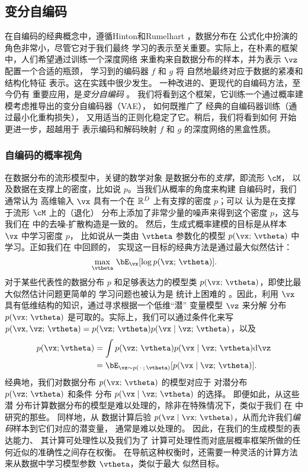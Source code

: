 \documentclass[../../book-main.tex]{subfiles}
\begin{document}
\subsection{变分自编码}\label{sec:vae}

在自编码的经典概念中，遵循Hinton和Rumelhart
\cite{Rumelhart1986}，数据分布在
公式化中扮演的角色非常小，尽管它对于我们最终
学习的表示至关重要。实际上，在朴素的框架中，人们希望通过训练一个深度网络
来重构来自数据分布的样本，并为表示 $\vz$ 配置一个合适的瓶颈，
学习到的编码器 $f$ 和 $g$ 将
自然地最终对应于数据的紧凑和结构化特征
表示。这在实践中很少发生。
一种改进的、更现代的自编码方法，至今仍有
重要应用，是\textit{变分自编码}
\cite{Kingma2013-sb,Kingma2019-zh}。
我们将看到这个框架，它训练一个通过概率建模考虑推导出的变分自编码器（VAE），
如何既推广了
经典的自编码器训练（通过最小化重构损失），
又用适当的正则化稳定了它。稍后，我们将看到如何
开始更进一步，超越用于
表示编码和解码映射 $f$ 和 $g$ 的深度网络的黑盒性质。

\subsubsection{自编码的概率视角}
在数据分布的流形模型中，关键的数学对象
是数据分布的\textit{支撑}，即流形 $\cM$，
以及数据在支撑上的密度，比如说 $p$。当我们从概率的角度来构建
自编码时，我们通常认为
高维输入 $\vx$ 具有一个在 $\mathbb{R}^D$ 上有支撑的密度 $p$；可以
认为是在支撑于流形 $\cM$ 上的（退化）
分布上添加了非常少量的噪声来得到这个密度 $p$，这与我们在  中的去噪-扩散构造是一致的。
然后，生成式概率建模的目标是从样本 $\vx$ 中学习密度 $p$，
比如说从一类由 $\vtheta$ 参数化的模型 $p(\vx;\, \vtheta)$ 中学习。正如我们在  中回顾的，
实现这一目标的经典方法是通过最大似然估计：
\begin{equation*}\label{eq:VAE-MLE}
\max_{\vtheta}\, \bE_{\vx}[ \log p(\vx;\, \vtheta) ].
\end{equation*}
对于某些代表性的数据分布 $p$ %
和足够表达力的模型类 $p(\vx;\, \vtheta)$，即使比最大似然估计问题更简单的
学习问题也被认为是
统计上困难的 \cite{Yang1999-wb}。因此，利用
$\vx$ 具有低维结构的知识，通过寻求根据一个低维“潜”
变量模型 $\vz$ 来分解
分布 $p(\vx ;\, \vtheta)$ 是可取的。实际上，我们可以通过条件化来写 $p(\vx,
\vz ;\, \vtheta)
= p(\vz;\, \vtheta) p(\vx \mid \vz;\, \vtheta)$，以及
\begin{align*}
p(\vx; \vtheta) &= \int p(\vz;\, \vtheta) p(\vx \mid \vz;\, \vtheta) \odif \vz
\\
&=
\bE_{\vz \sim p(\,\cdot\,;\, \vtheta)}[ p(\vx \mid \vz;\, \vtheta) ].
\end{align*}
经典地，我们对数据分布 $p(\vx;\, \vtheta)$ 的模型对应于
对潜分布 $p(\vz;\, \vtheta)$ 和条件
分布 $p(\vx \mid \vz;\, \vtheta)$ 的选择。
即便如此，从这些潜
分布计算数据分布的模型是难以处理的，除非在特殊情况下，类似于我们
在  中研究的那些。
同样地，从
数据计算后验 $p(\vz \mid \vx;\, \vtheta)$，从而允许我们\textit{编码}样本到它们对应的潜变量，
通常是难以处理的。
因此，在我们的生成模型的表达能力、
其计算可处理性以及我们为了
计算可处理性而对底层概率框架所做的任何近似的准确性之间存在权衡。
在导航这种权衡时，还需要一种灵活的计算方法
来从数据中学习模型参数 $\vtheta$，类似于最大
似然目标。
\end{document}
